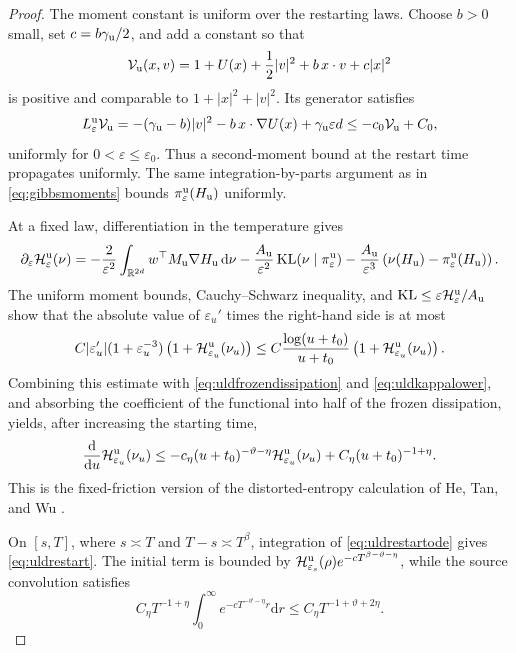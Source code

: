 \documentclass[11pt]{article}
\theoremstyle{definition}
\newcommand{\R}{\mathbb R}
\newcommand{\dd}{\mathrm d}
\newcommand{\KL}{\operatorname{KL}}
\newcommand{\cH}{\mathcal H}
\newcommand{\eps}{\varepsilon}
\begin{document}
\begin{proof}
The moment constant is uniform over the restarting laws. Choose $b>0$ small,
set $c=b\gamma_{\rm u}/2$, and add a constant so
that
\[
 \mathcal V_{\rm u}(x,v)
 =1+U(x)+\frac12|v|^2+b\,x\cdot v+c|x|^2
\]
is positive and comparable to $1+|x|^2+|v|^2$. Its generator satisfies
\[
 L^{\rm u}_{\eps}\mathcal V_{\rm u}
 =-(\gamma_{\rm u}-b)|v|^2-b\,x\cdot\nabla U(x)
       +\gamma_{\rm u}\eps d
 \leq-c_0\mathcal V_{\rm u}+C_0,
\]
uniformly for $0<\eps\leq\eps_0$. Thus a second-moment bound at the restart
time propagates uniformly. The same integration-by-parts argument as in
\eqref{eq:gibbsmoments} bounds
$\pi^{\rm u}_\eps(H_{\rm u})$ uniformly.

At a fixed law, differentiation in the temperature gives
\begin{align}\label{eq:uldtemperatureidentity}
 \partial_\eps\cH^{\rm u}_\eps(\nu)
 =-\frac{2}{\eps^2}\int_{\R^{2d}}
       w^\top M_{\rm u}\nabla H_{\rm u}\,\dd\nu
 -\frac{A_{\rm u}}{\eps^2}\KL(\nu\mid\pi^{\rm u}_\eps)
 -\frac{A_{\rm u}}{\eps^3}
       \left(\nu(H_{\rm u})-\pi^{\rm u}_\eps(H_{\rm u})\right).
\end{align}
The uniform moment bounds, Cauchy--Schwarz inequality, and
$\KL\leq\eps\cH^{\rm u}_\eps/A_{\rm u}$ show that the absolute value of
$\eps_u'$ times the right-hand side is at most
\[
 C|\eps_u'|(1+\eps_u^{-3})
       \left(1+\cH^{\rm u}_{\eps_u}(\nu_u)\right)
 \leq C\frac{\log(u+t_0)}{u+t_0}
       \left(1+\cH^{\rm u}_{\eps_u}(\nu_u)\right).
\]
Combining this estimate with \eqref{eq:uldfrozendissipation} and
\eqref{eq:uldkappalower}, and absorbing the coefficient of the functional
into half of the frozen dissipation, yields, after increasing the starting
time,
\begin{equation}\label{eq:uldrestartode}
 \frac{\dd}{\dd u}\cH^{\rm u}_{\eps_u}(\nu_u)
 \leq-c_\eta(u+t_0)^{-\vartheta-\eta}
             \cH^{\rm u}_{\eps_u}(\nu_u)
       +C_\eta(u+t_0)^{-1+\eta}.
\end{equation}
This is the fixed-friction version of the distorted-entropy calculation of
He, Tan, and Wu \cite[Sections~3.2--3.4]{HeTanWu2024}.

On $[s,T]$, where $s\asymp T$ and $T-s\asymp T^\beta$, integration of
\eqref{eq:uldrestartode} gives \eqref{eq:uldrestart}. The initial term is
bounded by
$\cH^{\rm u}_{\eps_s}(\rho)e^{-cT^{\beta-\vartheta-\eta}}$, while the source
convolution satisfies
\[
 C_\eta T^{-1+\eta}\int_0^\infty
 e^{-cT^{-\vartheta-\eta}r}\dd r
 \leq C_\eta T^{-1+\vartheta+2\eta}.
\]


\end{proof}
\end{document}
